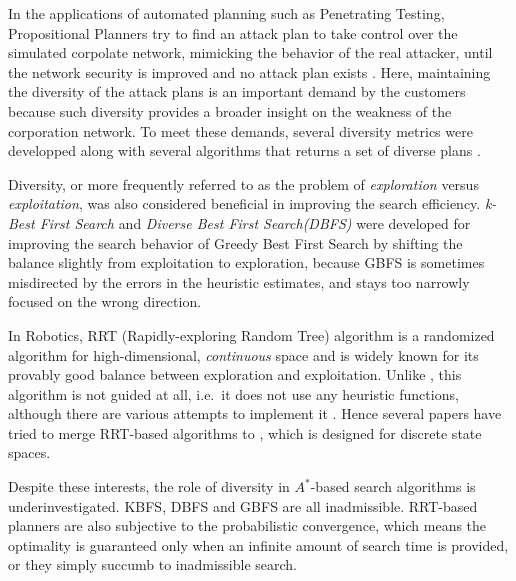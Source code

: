 
In the applications of automated planning such as Penetrating Testing,
Propositional Planners try to find an attack plan to take control over
the simulated corpolate network, mimicking the behavior of the real
attacker, until the network security is improved and no attack plan
exists \cite{boddy2005course}.  Here, maintaining the diversity of the
attack plans is an important demand by the customers because such
diversity provides a broader insight on the weakness of the corporation
network. To meet these demands, several diversity metrics were
developped \cite{roberts2014evaluating,goldman2015measuring} along with
several algorithms that returns a set of diverse plans
\cite{srivastava2007domain,coman2011generating,nguyen2012generating}.

Diversity, or more frequently referred to as the problem of
\emph{exploration} versus \emph{exploitation}, was also considered
beneficial in improving the search efficiency.  \emph{k-Best First
Search} \cite{felner2003kbfs} and \emph{Diverse Best First Search(DBFS)}
\cite{imai2011novel} were developed for improving the search behavior of
Greedy Best First Search by shifting the balance slightly from
exploitation to exploration, because GBFS is sometimes misdirected by
the errors in the heuristic estimates, and stays too narrowly focused on
the wrong direction.

In Robotics, RRT (Rapidly-exploring Random Tree) algorithm
\cite{lavalle2001randomized} is a \sota randomized algorithm for
high-dimensional, \emph{continuous} space and is widely known for its
provably good balance between exploration and exploitation. Unlike
\astar, this algorithm is not guided at all, i.e.\ it does not use any
heuristic functions, although there are various attempts to implement it
\cite{urmson2003approaches,urmson2003approaches}. Hence several papers
\cite{alcazar2011adapting,burfoot2006rrt,likhachev2008r} have tried to
merge RRT-based algorithms to \astar, which is designed for discrete
state spaces.

Despite these interests, the role of diversity in \(A^*\)-based search
algorithms is underinvestigated.
KBFS, DBFS and GBFS are all inadmissible.
RRT-based planners are also subjective to the probabilistic convergence,
which means the optimality is guaranteed only when an infinite amount of
search time is provided, or they simply succumb to inadmissible search.

